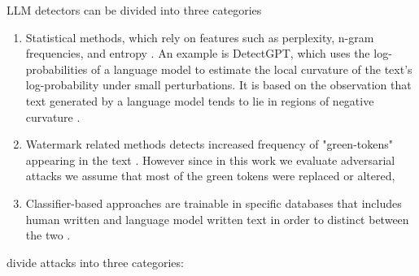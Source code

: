 \documentclass[W2, polski]{ThesisPLodz}
\let\cite\citep
\begin{document}
    LLM detectors can be divided into three categories
    \begin{enumerate}
        \item Statistical methods, which rely on features such as perplexity, n-gram frequencies, and entropy \cite{antoun2024}. An example is DetectGPT, which uses the log-probabilities of a language model to estimate the local curvature of the text's log-probability under small perturbations. It is based on the observation that text generated by a language model tends to lie in regions of negative curvature \cite{mitchell2023}.
        \item Watermark related methods detects increased frequency of "green-tokens" appearing in the text \cite{antoun2024}. However since in this work we evaluate adversarial attacks we assume that most of the green tokens were replaced or altered,
        \item Classifier-based approaches are trainable in specific databases that includes human written and language model written text in order to distinct between the two \cite{antoun2024}. 
    \end{enumerate}
    \cite{wu2025} divide attacks into three categories:
\end{document}
